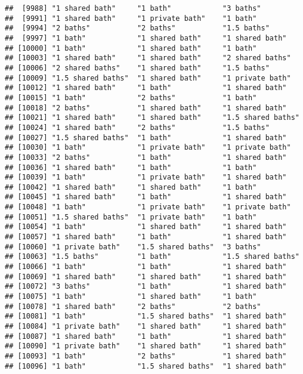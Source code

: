 \documentclass[
]{article}
\begin{document}
\begin{verbatim}
##  [9988] "1 shared bath"     "1 bath"            "3 baths"          
##  [9991] "1 shared bath"     "1 private bath"    "1 bath"           
##  [9994] "2 baths"           "2 baths"           "1.5 baths"        
##  [9997] "1 bath"            "1 shared bath"     "1 shared bath"    
## [10000] "1 bath"            "1 shared bath"     "1 bath"           
## [10003] "1 shared bath"     "1 shared bath"     "2 shared baths"   
## [10006] "2 shared baths"    "1 shared bath"     "1.5 baths"        
## [10009] "1.5 shared baths"  "1 shared bath"     "1 private bath"   
## [10012] "1 shared bath"     "1 bath"            "1 shared bath"    
## [10015] "1 bath"            "2 baths"           "1 bath"           
## [10018] "2 baths"           "1 shared bath"     "1 shared bath"    
## [10021] "1 shared bath"     "1 shared bath"     "1.5 shared baths" 
## [10024] "1 shared bath"     "2 baths"           "1.5 baths"        
## [10027] "1.5 shared baths"  "1 bath"            "1 shared bath"    
## [10030] "1 bath"            "1 private bath"    "1 private bath"   
## [10033] "2 baths"           "1 bath"            "1 shared bath"    
## [10036] "1 shared bath"     "1 bath"            "1 bath"           
## [10039] "1 bath"            "1 private bath"    "1 shared bath"    
## [10042] "1 shared bath"     "1 shared bath"     "1 bath"           
## [10045] "1 shared bath"     "1 bath"            "1 shared bath"    
## [10048] "1 bath"            "1 private bath"    "1 private bath"   
## [10051] "1.5 shared baths"  "1 private bath"    "1 bath"           
## [10054] "1 bath"            "1 shared bath"     "1 shared bath"    
## [10057] "1 shared bath"     "1 bath"            "1 shared bath"    
## [10060] "1 private bath"    "1.5 shared baths"  "3 baths"          
## [10063] "1.5 baths"         "1 bath"            "1.5 shared baths" 
## [10066] "1 bath"            "1 bath"            "1 shared bath"    
## [10069] "1 shared bath"     "1 shared bath"     "1 shared bath"    
## [10072] "3 baths"           "1 bath"            "1 shared bath"    
## [10075] "1 bath"            "1 shared bath"     "1 bath"           
## [10078] "1 shared bath"     "2 baths"           "2 baths"          
## [10081] "1 bath"            "1.5 shared baths"  "1 shared bath"    
## [10084] "1 private bath"    "1 shared bath"     "1 shared bath"    
## [10087] "1 shared bath"     "1 bath"            "1 shared bath"    
## [10090] "1 private bath"    "1 shared bath"     "1 shared bath"    
## [10093] "1 bath"            "2 baths"           "1 shared bath"    
## [10096] "1 bath"            "1.5 shared baths"  "1 shared bath"    

\end{verbatim}
\end{document}
